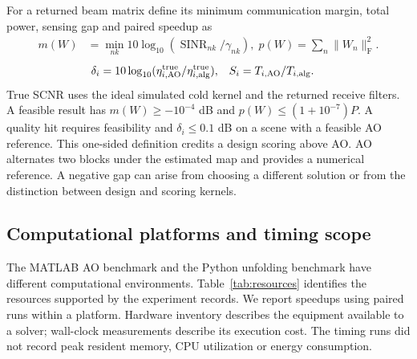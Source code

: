 \documentclass[journal]{IEEEtran}
\newcommand{\F}{_{\mathrm F}}
\newcommand{\sn}{\operatorname{SINR}}
\newcommand{\norm}[1]{\lVert #1\rVert}
\begin{document}
For a returned beam matrix define its minimum communication margin, total power, sensing gap and paired speedup as
\begin{align}
 m(W)&=\min_{nk}10\log_{10}(\sn_{nk}/\gamma_{nk}),\;
 p(W)=\sum_n\norm{W_n}\F^2.
\end{align}
\begin{align}
 \delta_i&=10\log_{10}(\eta^{\rm true}_{i,\rm AO}/
                               \eta^{\rm true}_{i,\rm alg}),&
 S_i&=T_{i,\rm AO}/T_{i,\rm alg}.
\end{align}
True SCNR uses the ideal simulated cold kernel and the returned receive filters. A feasible result has $m(W)\ge-10^{-4}$ dB and $p(W)\le(1+10^{-7})P$. A quality hit requires feasibility and $\delta_i\le0.1$ dB on a scene with a feasible AO reference. This one-sided definition credits a design scoring above AO. AO alternates two blocks under the estimated map and provides a numerical reference. A negative gap can arise from choosing a different solution or from the distinction between design and scoring kernels.

\subsection{Computational platforms and timing scope}
The MATLAB AO benchmark and the Python unfolding benchmark have different computational environments. Table~\ref{tab:resources} identifies the resources supported by the experiment records. We report speedups using paired runs within a platform. Hardware inventory describes the equipment available to a solver; wall-clock measurements describe its execution cost. The timing runs did not record peak resident memory, CPU utilization or energy consumption.
\end{document}
